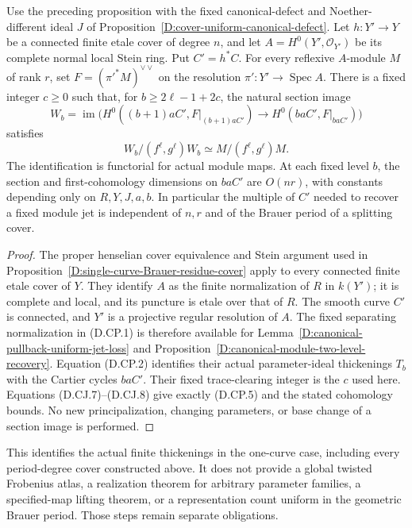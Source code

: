 \begin{corollary}
\label{D:single-curve-Cartier-module-jet-recovery}
Use the preceding proposition with the fixed canonical-defect
and Noether-different ideal $J$ of
Proposition~\ref{D:cover-uniform-canonical-defect}.
Let $h:Y'\to Y$ be a connected finite etale cover of degree $n$,
and let $A=H^0(Y',\mathcal O_{Y'})$ be its complete normal
local Stein ring. Put $C'=h^*C$.
For every reflexive $A$-module $M$ of rank $r$, set
$F=(\pi'^*M)^{\vee\vee}$ on the resolution
$\pi':Y'\to\operatorname{Spec}A$.
There is a fixed integer $c\ge0$ such that, for
$b\ge2\ell-1+2c$, the natural section image
\[
 W_b=\operatorname{im}\bigl(
 H^0((b+1)aC',F|_{(b+1)aC'})
 \longrightarrow H^0(baC',F|_{baC'})\bigr)
\]
satisfies
\[
           W_b/(f^\ell,g^\ell)W_b
                  \simeq M/(f^\ell,g^\ell)M.
                                                        \tag{D.CP.5}
\]
The identification is functorial for actual module maps.
At each fixed level $b$, the section and first-cohomology
dimensions on $baC'$ are $O(nr)$, with constants depending
only on $R,Y,J,a,b$. In particular the multiple of $C'$
needed to recover a fixed module jet is independent of $n,r$
and of the Brauer period of a splitting cover.
\end{corollary}

\begin{proof}
The proper henselian cover equivalence and Stein argument used
in Proposition~\ref{D:single-curve-Brauer-residue-cover} apply
to every connected finite etale cover of $Y$. They identify
$A$ as the finite normalization of $R$ in $k(Y')$; it is
complete and local, and its puncture is etale over that of
$R$. The smooth curve $C'$ is connected, and $Y'$ is a
projective regular resolution of $A$.
The fixed separating normalization in (D.CP.1) is therefore
available for
Lemma~\ref{D:canonical-pullback-uniform-jet-loss} and
Proposition~\ref{D:canonical-module-two-level-recovery}.
Equation (D.CP.2) identifies their actual parameter-ideal
thickenings $T_b$ with the Cartier cycles $baC'$.
Their fixed trace-clearing integer is the $c$ used here.
Equations (D.CJ.7)--(D.CJ.8) give exactly (D.CP.5) and the
stated cohomology bounds. No new principalization, changing
parameters, or base change of a section image is performed.
\end{proof}

\begin{remark}
This identifies the actual finite thickenings in the one-curve
case, including every period-degree cover constructed above.
It does not provide a global twisted Frobenius atlas, a
realization theorem for arbitrary parameter families, a
specified-map lifting theorem, or a representation count
uniform in the geometric Brauer period. Those steps remain
separate obligations.
\end{remark}

